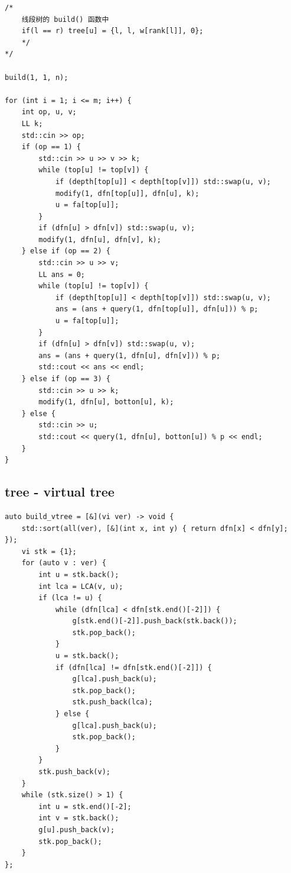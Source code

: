 \documentclass[UTF8, a4paper, titlepage, twoside]{ctexart}
\begin{document}
\begin{lstlisting}[style=cpp]
    /* 
    线段树的 build() 函数中 
    if(l == r) tree[u] = {l, l, w[rank[l]], 0}; 
    */
*/

build(1, 1, n);

for (int i = 1; i <= m; i++) {
    int op, u, v;
    LL k;
    std::cin >> op;
    if (op == 1) {
        std::cin >> u >> v >> k;
        while (top[u] != top[v]) {
            if (depth[top[u]] < depth[top[v]]) std::swap(u, v);
            modify(1, dfn[top[u]], dfn[u], k);
            u = fa[top[u]];
        }
        if (dfn[u] > dfn[v]) std::swap(u, v);
        modify(1, dfn[u], dfn[v], k);
    } else if (op == 2) {
        std::cin >> u >> v;
        LL ans = 0;
        while (top[u] != top[v]) {
            if (depth[top[u]] < depth[top[v]]) std::swap(u, v);
            ans = (ans + query(1, dfn[top[u]], dfn[u])) % p;
            u = fa[top[u]];
        }
        if (dfn[u] > dfn[v]) std::swap(u, v);
        ans = (ans + query(1, dfn[u], dfn[v])) % p;
        std::cout << ans << endl;
    } else if (op == 3) {
        std::cin >> u >> k;
        modify(1, dfn[u], botton[u], k);
    } else {
        std::cin >> u;
        std::cout << query(1, dfn[u], botton[u]) % p << endl;
    }
}
\end{lstlisting}

\subsection{ tree - virtual tree }
\begin{lstlisting}[style=cpp]
auto build_vtree = [&](vi ver) -> void {
    std::sort(all(ver), [&](int x, int y) { return dfn[x] < dfn[y]; });
    vi stk = {1};
    for (auto v : ver) {
        int u = stk.back();
        int lca = LCA(v, u);
        if (lca != u) {
            while (dfn[lca] < dfn[stk.end()[-2]]) {
                g[stk.end()[-2]].push_back(stk.back());
                stk.pop_back();
            }
            u = stk.back();
            if (dfn[lca] != dfn[stk.end()[-2]]) {
                g[lca].push_back(u);
                stk.pop_back();
                stk.push_back(lca);
            } else {
                g[lca].push_back(u);
                stk.pop_back();
            }
        }
        stk.push_back(v);
    }
    while (stk.size() > 1) {
        int u = stk.end()[-2];
        int v = stk.back();
        g[u].push_back(v);
        stk.pop_back();
    }
};
\end{lstlisting}
\end{document}
